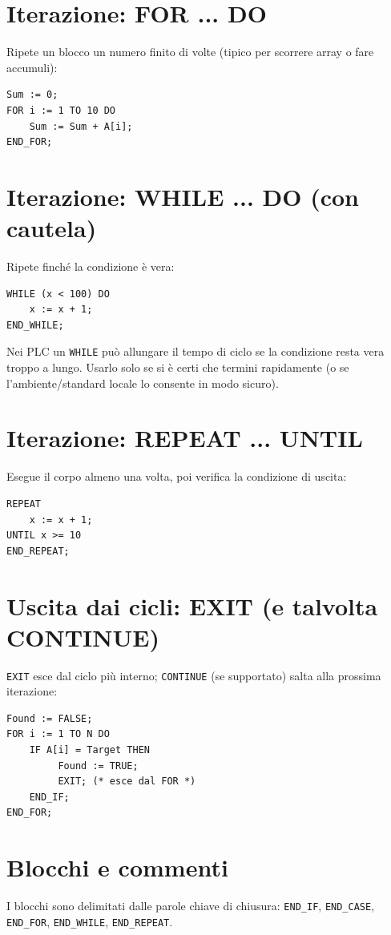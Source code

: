 \section{Iterazione: FOR ... DO}
Ripete un blocco un numero finito di volte (tipico per scorrere array o fare accumuli):
\begin{lstlisting}[basicstyle=\ttfamily\small]
Sum := 0;
FOR i := 1 TO 10 DO
    Sum := Sum + A[i];
END_FOR;
\end{lstlisting}

\section{Iterazione: WHILE ... DO (con cautela)}
Ripete finché la condizione è vera:
\begin{lstlisting}[basicstyle=\ttfamily\small]
WHILE (x < 100) DO
    x := x + 1;
END_WHILE;
\end{lstlisting}
\begin{note}[Attenzione]
Nei PLC un \texttt{WHILE} può allungare il tempo di ciclo se la condizione resta vera troppo a lungo. Usarlo solo se si è certi che termini rapidamente (o se l'ambiente/standard locale lo consente in modo sicuro).
\end{note}

\section{Iterazione: REPEAT ... UNTIL}
Esegue il corpo almeno una volta, poi verifica la condizione di uscita:
\begin{lstlisting}[basicstyle=\ttfamily\small]
REPEAT
    x := x + 1;
UNTIL x >= 10
END_REPEAT;
\end{lstlisting}

\section{Uscita dai cicli: EXIT (e talvolta CONTINUE)}
\texttt{EXIT} esce dal ciclo più interno; \texttt{CONTINUE} (se supportato) salta alla prossima iterazione:
\begin{lstlisting}[basicstyle=\ttfamily\small]
Found := FALSE;
FOR i := 1 TO N DO
    IF A[i] = Target THEN
         Found := TRUE;
         EXIT; (* esce dal FOR *)
    END_IF;
END_FOR;
\end{lstlisting}

\section{Blocchi e commenti}
I blocchi sono delimitati dalle parole chiave di chiusura: \texttt{END\_IF}, \texttt{END\_CASE}, \texttt{END\_FOR}, \texttt{END\_WHILE}, \texttt{END\_REPEAT}.

